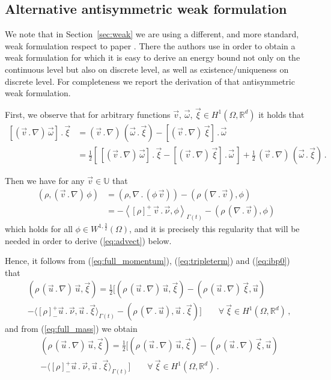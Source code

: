 \documentclass[a4paper,12pt,onecolumn]{article}
\newcommand{\R}{{\mathbb R}}
\newcommand{\uspace}{\mathbb{U}}
\begin{document}
\subsection{Alternative antisymmetric weak formulation}

We note that in Section~\ref{sec:weak} we are using a different, and more
standard, weak formulation respect to paper \cite{fluidfbp}. There the authors
use \cite[eq. 3.7]{fluidfbp} in order to obtain a weak formulation for which it
is easy to derive an energy bound not only on the continuous level but also on
discrete level, as well as existence/uniqueness on discrete level. For
completeness we report the derivation of that antisymmetric weak formulation.

First, we observe that for arbitrary functions $\vec v$,
$\vec \omega$, $\vec \xi \in H^1(\Omega,\R^d)$ it holds that
\begin{align} \label{eq:tripleterm}
[(\vec v\,.\,\nabla)\,\vec \omega]\,.\,\vec \xi
&= (\vec v\,.\,\nabla)\,(\vec \omega\,.\,\vec \xi) -
[(\vec v\,.\,\nabla)\,\vec \xi]\,.\,\vec \omega \nonumber \\ &
= \tfrac{1}{2} \left[\,
[(\vec v\,.\,\nabla)\,\vec \omega]\,.\,\vec \xi - [(\vec v\,.\,\nabla)\,\vec
\xi] \,.\,\vec \omega\,\right] + \tfrac{1}{2}\,(\vec v\,.\,\nabla)\,
(\vec \omega\,.\,\vec \xi)\,.
\end{align}

Then we have for any $\vec v \in \uspace$ that
\begin{align} \label{eq:ibp0}
( \rho,(\vec v \,.\,\nabla)\,\phi) & = (\rho, \nabla\,.\,(\phi\,\vec v))
- (\rho\,(\nabla\,.\,\vec v), \phi) \nonumber \\ & =
- \left\langle [\rho]_-^+\,\vec v\,.\,\vec \nu,
  \phi \right\rangle_{\Gamma(t)}
- (\rho\,(\nabla\,.\,\vec v), \phi)
\end{align}
which holds for all $\phi\in W^{1,\frac{3}{2}}(\Omega)$, and it is
precisely this regularity that will be needed in order to derive
(\ref{eq:advect}) below.

Hence, it follows from (\ref{eq:full_momentum}),
(\ref{eq:tripleterm}) and (\ref{eq:ibp0}) that
\begin{align}\label{eq:fulladvect}
& ( \rho\,(\vec u \,.\,\nabla)\,\vec u, \vec \xi)
= \tfrac{1}{2} [ (\rho\,(\vec u\,.\,\nabla)\,\vec u, \vec \xi) -
(\rho\,(\vec u\,.\,\nabla)\,\vec \xi,\vec u) \nonumber \\
& -\langle [\rho]_-^+\vec u\,.\,\vec \nu, \vec u\,.\,\vec \xi
\rangle_{\Gamma(t)} -(\rho\,(\nabla\,.\,\vec u ),\vec u\,.\,\vec\xi) ] \qquad
\forall\ \vec \xi \in H^1(\Omega,{\mathbb R}^d)\,,
\end{align}
and from (\ref{eq:full_mass}) we obtain
\begin{align}\label{eq:advect}
& ( \rho\,(\vec u \,.\,\nabla)\,\vec u, \vec \xi)
= \tfrac{1}{2} [ (\rho\,(\vec u\,.\,\nabla)\,\vec u, \vec \xi) -
(\rho\,(\vec u\,.\,\nabla)\,\vec \xi,\vec u) \nonumber \\
& -\langle [\rho]_-^+\vec u\,.\,\vec \nu, \vec u\,.\,\vec \xi
\rangle_{\Gamma(t)}] \qquad \forall\ \vec \xi \in H^1(\Omega,{\mathbb R}^d)\,.
\end{align}
\end{document}
